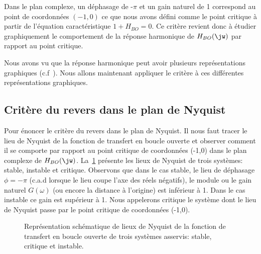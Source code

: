 Dans le plan complexe, un  déphasage de -$\pi$ et un gain naturel de 1 
correspond au point de coordonnées $(-1,0)$ ce que nous avons défini comme 
le point critique à partir de l'équation caractéristique $1+H_{BO}=0$. 
Ce critère revient donc à étudier graphiquement le comportement 
de la réponse harmonique de $H_{BO}(\jw)$ par rapport au point critique.

Nous avons vu que la réponse harmonique peut avoir plusieurs représentations
graphiques (c.f~). Nous allons maintenant appliquer le 
critère à ces différentes représentations graphiques.

\clearpage
\subsection{Critère du revers dans le plan de Nyquist
}

Pour énoncer le critère du revers dans le plan de Nyquist. Il nous faut tracer
le lieu de Nyquist de la fonction de transfert en boucle ouverte et observer 
comment il se comporte par rapport au point critique de coordonnées (-1,0) 
dans le plan complexe de $H_{BO}(\jw)$. La~\cref{fig-nyquist_revers} présente 
les lieux de Nyquist de trois systèmes: stable, instable et critique. Observons
que dans le cas stable, le lieu de déphasage $\phi=-\pi$ (c.a.d lorsque le lieu
coupe l'axe des réels négatifs), le module ou le gain naturel $G(\omega)$ (ou 
encore la distance à l'origine) est inférieur à 1. Dans le cas instable ce gain 
est supérieur à 1. Nous appelerons critique le système dont le lieu de Nyquist 
passe par le point critique de coordonnées (-1,0).

\begin{figure}[!h]
    \centering
    
    \caption{Représentation schématique de lieux de Nyquist de la fonction 
             de transfert en boucle ouverte de trois systèmes asservis: 
             stable, critique et instable. \label{fig-nyquist_revers}}
\end{figure}

